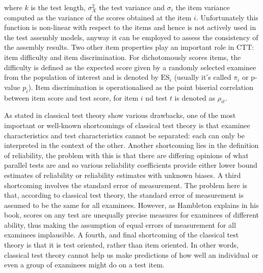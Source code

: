 where $k$ is the test length, $\sigma^2_X$ the test variance and $\sigma_i$ the item variance computed as the variance of the scores obtained at the item $i$. Unfortunately this function is non-linear with respect to the items and hence is not actively used in the test assembly models, anyway it can be employed to assess the consistency of the assembly results.
Two other item properties play an important role in CTT: item difficulty and item discrimination.
For dichotomously scores items, the difficulty is defined as the expected score given by a randomly selected examinee from the population of interest and is denoted by $\text{ES}_i$ (usually it's called $\pi_i$ or p-value $p_i$). Item discrimination is operationalised as the point biserial correlation between item score and test score, for item $i$ nd test $t$ is denoted as $\rho_{it}$.\\
\par
As stated in \cite{Hamb91} classical test theory show various drawbacks, one of the most important or well-known shortcomings of classical test theory is that examinee characteristics and test characteristics cannot be separated: each can only be interpreted in the context of the other. Another shortcoming lies in the definition of reliability, the problem with this is that there are differing opinions of what parallel tests are and so various reliability coefficients provide either lower bound estimates of reliability or reliability estimates with unknown biases. A third shortcoming involves the standard error of measurement. The problem here is that, according to classical test theory, the standard error of measurement is assumed to be the same for all examinees. However, as Hambleton explains in his book, scores on any test are unequally precise measures for examinees of different ability, thus making the assumption of equal errors of measurement for all examinees implausible. A fourth, and final shortcoming of the classical test theory is that it is test oriented, rather than item oriented. In other words, classical test theory cannot help us make predictions of how well an individual or even a group of examinees might do on a test item.\\
